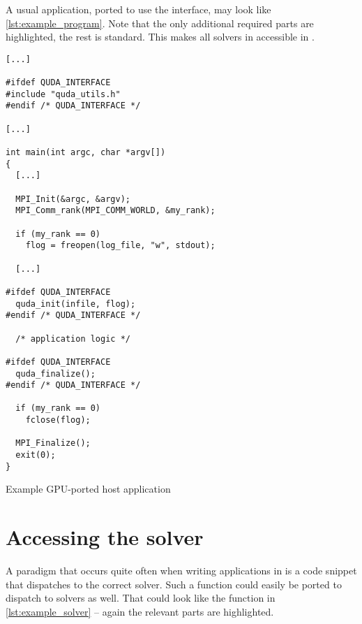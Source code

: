 A usual application, ported to use the \quda interface, may look like \cref{lst:example_program}. Note that the only additional required parts are highlighted, the rest is standard.
This makes all solvers in \quda accessible in \openqxd.
\begin{codelisting}
\begin{verbatim}
[...]

#ifdef QUDA_INTERFACE
#include "quda_utils.h"
#endif /* QUDA_INTERFACE */

[...]

int main(int argc, char *argv[])
{
  [...]

  MPI_Init(&argc, &argv);
  MPI_Comm_rank(MPI_COMM_WORLD, &my_rank);

  if (my_rank == 0)
    flog = freopen(log_file, "w", stdout);

  [...]

#ifdef QUDA_INTERFACE
  quda_init(infile, flog);
#endif /* QUDA_INTERFACE */

  /* application logic */

#ifdef QUDA_INTERFACE
  quda_finalize();
#endif /* QUDA_INTERFACE */

  if (my_rank == 0)
    fclose(flog);

  MPI_Finalize();
  exit(0);
}
\end{verbatim}
\caption{Example GPU-ported host application}
\label{lst:example_program}
\end{codelisting}


\section{Accessing the solver}
\label{sec:develop:solver}

A paradigm that occurs quite often when writing applications in \openqxd is a code snippet that dispatches to the correct solver.
Such a function could easily be ported to dispatch to \qudas solvers as well.
That could look like the function  in \cref{lst:example_solver} -- again the relevant parts are highlighted.

